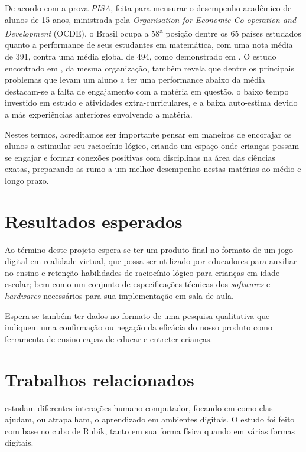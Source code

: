 De acordo com a prova \textit{PISA}, feita para mensurar o desempenho acadêmico de alunos de 15 anos, ministrada pela \textit{Organisation for Economic Co-operation and Development} (OCDE), o Brasil ocupa a 58\textsuperscript{a} posição dentre os 65 países estudados quanto a performance de seus estudantes em matemática, com uma nota média de 391, contra uma média global de 494, como demonstrado em \cite{OECD:2012:pisa-brazil}. 
O estudo encontrado em \cite{OECD:2016:low_performing_students}, da mesma organização, também revela que dentre os principais problemas que levam um aluno a ter uma performance abaixo da média destacam-se a falta de engajamento com a matéria em questão, o baixo tempo investido em estudo e atividades extra-curriculares, e a baixa auto-estima devido a más experiências anteriores envolvendo a matéria.

Nestes termos, acreditamos ser importante pensar em maneiras de encorajar os alunos a estimular seu raciocínio lógico, criando um espaço onde crianças possam se engajar e formar conexões positivas com disciplinas na área das ciências exatas, preparando-as rumo a um melhor desempenho nestas matérias ao médio e longo prazo.

\section{Resultados esperados}\label{sec-resultados-esperados}

Ao término deste projeto espera-se ter um produto final no formato de um jogo digital em realidade virtual, que possa ser utilizado por educadores para auxiliar no ensino e retenção habilidades de raciocínio lógico para crianças em idade escolar; bem como um conjunto de especificações técnicas dos \textit{softwares} e \textit{hardwares} necessários para sua implementação em sala de aula.

Espera-se também ter dados no formato de uma pesquisa qualitativa que indiquem uma confirmação ou negação da eficácia do nosso produto como ferramenta de ensino capaz de educar e entreter crianças.

\section{Trabalhos relacionados}\label{sec-trabalhos-relacionados}

\cite{Tabuti:2010:analise} estudam diferentes interações humano-computador, 
focando em como elas ajudam, ou atrapalham, o aprendizado em ambientes 
digitais. O estudo foi feito com base no cubo de Rubik, tanto em sua 
forma física quando em várias formas digitais.

